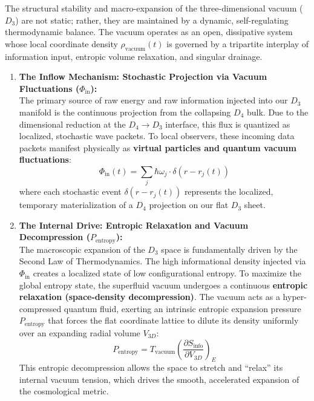 \documentclass[11pt,a4paper]{article}
\theoremstyle{plain}
\theoremstyle{definition}
\theoremstyle{remark}
\begin{document}
The structural stability and macro-expansion of the three-dimensional vacuum ($D_3$) are not static; rather, they are maintained by a dynamic, self-regulating thermodynamic balance. The vacuum operates as an open, dissipative system whose local coordinate density $\rho_{\text{vacuum}}(t)$ is governed by a tripartite interplay of information input, entropic volume relaxation, and singular drainage.
\begin{enumerate}
    \item \textbf{The Inflow Mechanism: Stochastic Projection via Vacuum Fluctuations ($\Phi_{\text{in}}$):} \\
    The primary source of raw energy and raw information injected into our $D_3$ manifold is the continuous projection from the collapsing $D_4$ bulk. Due to the dimensional reduction at the $D_4 \to D_3$ interface, this flux is quantized as localized, stochastic wave packets. To local observers, these incoming data packets manifest physically as \textbf{virtual particles and quantum vacuum fluctuations}:
    \begin{equation}
    \Phi_{\text{in}}(t) = \sum_{j} \hbar \omega_j \cdot \delta(r - r_j(t))
    \end{equation}
    where each stochastic event $\delta(r - r_j(t))$ represents the localized, temporary materialization of a $D_4$ projection on our flat $D_3$ sheet.
    \item \textbf{The Internal Drive: Entropic Relaxation and Vacuum Decompression ($P_{\text{entropy}}$):} \\
    The macroscopic expansion of the $D_3$ space is fundamentally driven by the Second Law of Thermodynamics. The high informational density injected via $\Phi_{\text{in}}$ creates a localized state of low configurational entropy. To maximize the global entropy state, the superfluid vacuum undergoes a continuous \textbf{entropic relaxation (space-density decompression)}. The vacuum acts as a hyper-compressed quantum fluid, exerting an intrinsic entropic expansion pressure $P_{\text{entropy}}$ that forces the flat coordinate lattice to dilute its density uniformly over an expanding radial volume $V_{3D}$:
    \begin{equation}
    P_{\text{entropy}} = T_{\text{vacuum}} \left( \frac{\partial S_{\text{info}}}{\partial V_{3D}} \right)_{E}
    \end{equation}
    This entropic decompression allows the space to stretch and ``relax'' its internal vacuum tension, which drives the smooth, accelerated expansion of the cosmological metric.

\end{enumerate}
\end{document}
